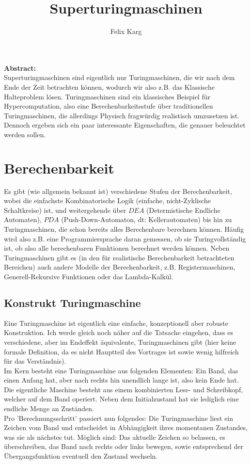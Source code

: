 \documentclass{scrartcl}
\title{Superturingmaschinen}
\author{Felix Karg}
\begin{document}
\maketitle

\textbf{\large {Abstract:} } \\
Superturingmaschinen sind eigentlich nur Turingmaschinen, die wir nach dem Ende
der Zeit betrachten können, wodurch wir also z.B. das Klassische Halteproblem
lösen. Turingmaschinen sind ein klassisches Beispiel für Hypercomputation, also
eine Berechenbarkeitsstufe über traditionellen Turingmaschinen, die allerdings
Physisch fragwürdig realistisch umzusetzen ist. Dennoch ergeben sich ein paar
interessante Eigenschaften, die genauer beleuchtet werden sollen.


\section{Berechenbarkeit}
Es gibt (wie allgemein bekannt ist) verschiedene Stufen der Berechenbarkeit,
wobei die einfachste Kombinatorische Logik (einfache, nicht-Zyklische
Schaltkreise) ist, und weitergehende über $DEA$ (Determistische Endliche
Automaten), $PDA$ (Push-Down-Automaton, dt: Kellerautomaten)
bis hin zu Turingmaschinen, die schon bereits alles Berechenbare berechnen
können. Häufig wird also z.B. eine Programmiersprache daran gemessen, ob sie
Turingvollständig ist, ob also alle berechenbaren Funktionen berechnet werden
können. Neben Turingmaschinen gibt es (in den für realistische Berechenbarkeit
betrachteten Bereichen) auch andere Modelle der Berechenbarkeit, z.B.
Registermaschinen, Generell-Rekursive Funktionen oder das Lambda-Kalkül.


\subsection{Konstrukt Turingmaschine}
Eine Turingmaschine ist eigentlich eine einfache, konzeptionell aber
robuste Konstruktion. Ich werde gleich noch näher auf die Tatsache eingehen, dass es
verschiedene, aber im Endeffekt äquivalente, Turingmaschinen gibt (hier keine
formale Definition, da es nicht Hauptteil des Vortrages ist sowie wenig
hilfreich für das Verständnis). \\
Im Kern besteht eine Turingmaschine aus folgenden Elementen: Ein Band, das
einen Anfang hat, aber nach rechts hin unendlich lange ist, also kein Ende hat.
Die eigentliche Maschine besteht aus einem kombinierten Lese- und Schreibkopf,
welcher auf dem Band operiert. Neben dem Initialzustand hat sie lediglich eine
endliche Menge an Zuständen. \\
Pro 'Berechnungsschritt'
passiert nun folgendes: Die Turingmaschine liest ein Zeichen vom Band und
entscheidet in Abhängigkeit ihres momentanen Zustandes, was sie als nächstes tut.
Möglich sind: Das aktuelle Zeichen so belassen, es überschreiben, das Band nach
rechts oder links bewegen, sowie entsprechend der Übergangsfunktion eventuell
den Zustand wechseln.
\end{document}
